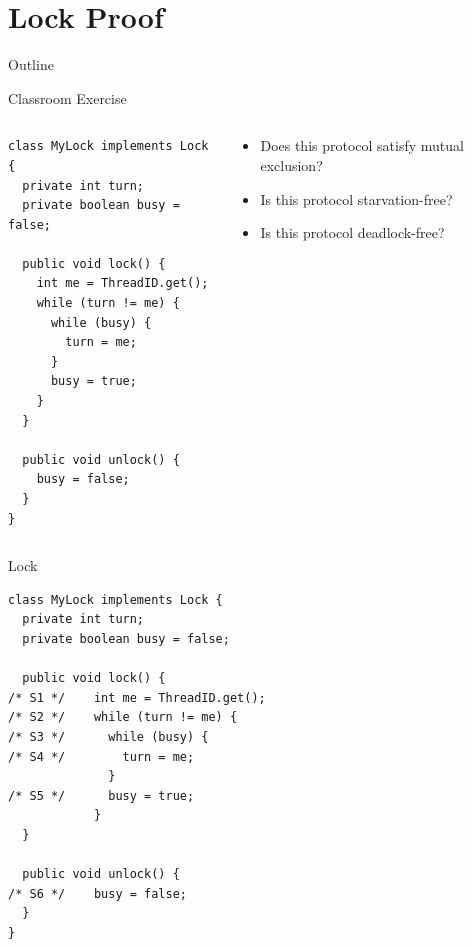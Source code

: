 \section{Lock Proof}

\begin{frame}{Outline}
  \tableofcontents[current]
\end{frame}

\begin{frame}[fragile]{Classroom Exercise}
  \begin{columns}[c]
    \begin{column}{0.50\textwidth}
\begin{lstlisting}[basicstyle=\fontsize{9}{11}\selectfont\ttfamily]
class MyLock implements Lock {
  private int turn;
  private boolean busy = false;

  public void lock() {
    int me = ThreadID.get();
    while (turn != me) {
      while (busy) {
        turn = me;
      }
      busy = true;
    }
  }

  public void unlock() {
    busy = false;
  }
}
\end{lstlisting}
    \end{column}
    \begin{column}{0.50\textwidth}
      \begin{itemize}
      \item Does this protocol satisfy mutual exclusion?
      \item Is this protocol starvation-free?
      \item Is this protocol deadlock-free?
  \end{itemize}
    \end{column}
  \end{columns}
\end{frame}

\begin{frame}[fragile]{Lock}
\begin{lstlisting}[basicstyle=\fontsize{9}{11}\selectfont\ttfamily]
class MyLock implements Lock {
  private int turn;
  private boolean busy = false;

  public void lock() {
/* S1 */    int me = ThreadID.get();
/* S2 */    while (turn != me) {
/* S3 */      while (busy) {
/* S4 */        turn = me;
              }
/* S5 */      busy = true;
            }
  }

  public void unlock() {
/* S6 */    busy = false;
  }
}
\end{lstlisting}
\end{frame}

